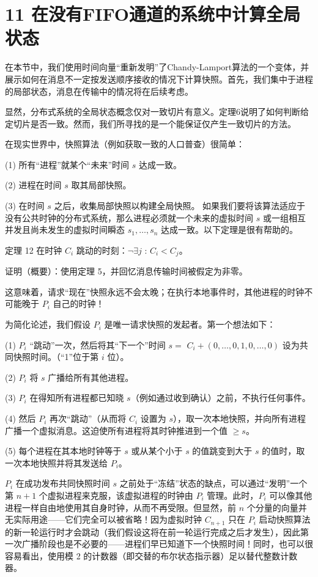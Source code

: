 \documentclass[12pt,a4paper]{report} %
\begin{document}
\section*{11 在没有FIFO通道的系统中计算全局状态}

在本节中，我们使用时间向量“重新发明”了Chandy-Lamport算法的一个变体，并展示如何在消息不一定按发送顺序接收的情况下计算快照。首先，我们集中于进程的局部状态，消息在传输中的情况将在后续考虑。

显然，分布式系统的全局状态概念仅对一致切片有意义。定理6说明了如何判断给定切片是否一致。然而，我们所寻找的是一个能保证仅产生一致切片的方法。

在现实世界中，快照算法（例如获取一致的人口普查）很简单：

(1) 所有“进程”就某个“未来”时间 $s$ 达成一致。

(2) 进程在时间 $s$ 取其局部快照。

(3) 在时间 $s$ 之后，收集局部快照以构建全局快照。
如果我们要将该算法适应于没有公共时钟的分布式系统，那么进程必须就一个未来的虚拟时间 $s$ 或一组相互并发且尚未发生的虚拟时间瞬态 $s_{1}, \ldots, s_{n}$ 达成一致。以下定理是很有帮助的。

定理 12 在时钟 $C_{i}$ 跳动的时刻：$\neg \exists j$ : $C_{i}<C_{j}$。

证明（概要）：使用定理 5，并回忆消息传输时间被假定为非零。

这意味着，请求“现在”快照永远不会太晚；在执行本地事件时，其他进程的时钟不可能晚于 $P_{i}$ 自己的时钟！

为简化论述，我们假设 $P_{i}$ 是唯一请求快照的发起者。第一个想法如下：

(1) $P_{i}$ “跳动”一次，然后将其“下一个”时间 $s=$ $C_{i}+(0, \ldots, 0,1,0, \ldots, 0)$ 设为共同快照时间。（“1”位于第 $i$ 位）。

(2) $P_{i}$ 将 $s$ 广播给所有其他进程。

(3) $P_{i}$ 在得知所有进程都已知晓 $s$（例如通过收到确认）之前，不执行任何事件。

(4) 然后 $P_{i}$ 再次“跳动”（从而将 $C_{i}$ 设置为 $s$），取一次本地快照，并向所有进程广播一个虚拟消息。这迫使所有进程将其时钟推进到一个值 $\geq s$。

(5) 每个进程在其本地时钟等于 $s$ 或从某个小于 $s$ 的值跳变到大于 $s$ 的值时，取一次本地快照并将其发送给 $P_{i}$。

$P_{i}$ 在成功发布共同快照时间 $s$ 之前处于“冻结”状态的缺点，可以通过“发明”一个第 $n+1$ 个虚拟进程来克服，该虚拟进程的时钟由 $P_{i}$ 管理。此时，$P_{i}$ 可以像其他进程一样自由地使用其自身时钟，从而不再受限。但显然，前 $n$ 个分量的向量并无实际用途——它们完全可以被省略！因为虚拟时钟 $C_{n+1}$ 只在 $P_{i}$ 启动快照算法的新一轮运行时才会跳动（我们假设这将在前一轮运行完成之后才发生），因此第一次广播阶段也是不必要的——进程们早已知道下一个快照时间！同时，也可以很容易看出，使用模 2 的计数器（即交替的布尔状态指示器）足以替代整数计数器。
\end{document}

